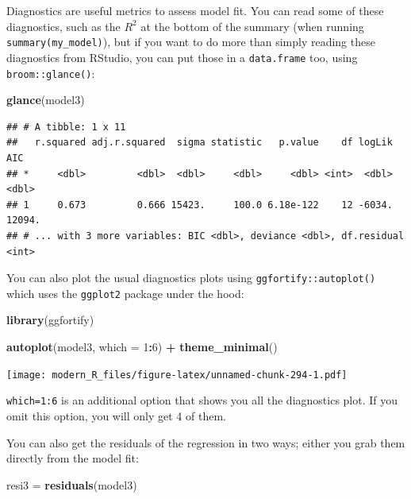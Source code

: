\documentclass[]{gitbook}
\newenvironment{Shaded}{\begin{snugshade}}{\end{snugshade}}
\newcommand{\DataTypeTok}[1]{\textcolor[rgb]{0.13,0.29,0.53}{#1}}
\newcommand{\DecValTok}[1]{\textcolor[rgb]{0.00,0.00,0.81}{#1}}
\newcommand{\KeywordTok}[1]{\textcolor[rgb]{0.13,0.29,0.53}{\textbf{#1}}}
\newcommand{\NormalTok}[1]{#1}
\newcommand{\OperatorTok}[1]{\textcolor[rgb]{0.81,0.36,0.00}{\textbf{#1}}}
\newcommand{\StringTok}[1]{\textcolor[rgb]{0.31,0.60,0.02}{#1}}
\theoremstyle{definition}
\theoremstyle{definition}
\theoremstyle{definition}
\theoremstyle{remark}
\begin{document}
Diagnostics are useful metrics to assess model fit. You can read some of
these diagnostics, such as the \(R^2\) at the bottom of the summary
(when running \texttt{summary(my\_model)}), but if you want to do more
than simply reading these diagnostics from RStudio, you can put those in
a \texttt{data.frame} too, using \texttt{broom::glance()}:

\begin{Shaded}
\begin{Highlighting}[]
\KeywordTok{glance}\NormalTok{(model3)}
\end{Highlighting}
\end{Shaded}

\begin{verbatim}
## # A tibble: 1 x 11
##   r.squared adj.r.squared  sigma statistic   p.value    df logLik    AIC
## *     <dbl>         <dbl>  <dbl>     <dbl>     <dbl> <int>  <dbl>  <dbl>
## 1     0.673         0.666 15423.     100.0 6.18e-122    12 -6034. 12094.
## # ... with 3 more variables: BIC <dbl>, deviance <dbl>, df.residual <int>
\end{verbatim}

You can also plot the usual diagnostics plots using
\texttt{ggfortify::autoplot()} which uses the \texttt{ggplot2} package
under the hood:

\begin{Shaded}
\begin{Highlighting}[]
\KeywordTok{library}\NormalTok{(ggfortify)}

\KeywordTok{autoplot}\NormalTok{(model3, }\DataTypeTok{which =} \DecValTok{1}\OperatorTok{:}\DecValTok{6}\NormalTok{) }\OperatorTok{+}\StringTok{ }\KeywordTok{theme_minimal}\NormalTok{()}
\end{Highlighting}
\end{Shaded}

\texttt{[image: modern\_R\_files/figure-latex/unnamed-chunk-294-1.pdf]}

\texttt{which=1:6} is an additional option that shows you all the
diagnostics plot. If you omit this option, you will only get 4 of them.

You can also get the residuals of the regression in two ways; either you
grab them directly from the model fit:

\begin{Shaded}
\begin{Highlighting}[]
\NormalTok{resi3 =}\StringTok{ }\KeywordTok{residuals}\NormalTok{(model3)}
\end{Highlighting}
\end{Shaded}
\end{document}
